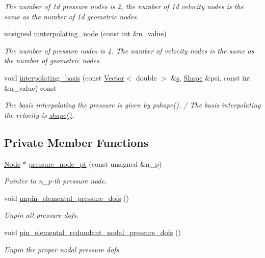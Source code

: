 \begin{DoxyCompactItemize}
\begin{DoxyCompactList}\small\item\em The number of 1d pressure nodes is 2, the number of 1d velocity nodes is the same as the number of 1d geometric nodes. \end{DoxyCompactList}\item 
unsigned \hyperlink{classoomph_1_1RefineableAxisymmetricQTaylorHoodElement_a637fff45cb50b55c9c05633321489b89}{ninterpolating\+\_\+node} (const int \&n\+\_\+value)
\begin{DoxyCompactList}\small\item\em The number of pressure nodes is 4. The number of velocity nodes is the same as the number of geometric nodes. \end{DoxyCompactList}\item 
void \hyperlink{classoomph_1_1RefineableAxisymmetricQTaylorHoodElement_a20d24729129ee059ab89b407c02d1cb8}{interpolating\+\_\+basis} (const \hyperlink{classoomph_1_1Vector}{Vector}$<$ double $>$ \&\hyperlink{cfortran_8h_ab7123126e4885ef647dd9c6e3807a21c}{s}, \hyperlink{classoomph_1_1Shape}{Shape} \&psi, const int \&n\+\_\+value) const
\begin{DoxyCompactList}\small\item\em The basis interpolating the pressure is given by pshape(). / The basis interpolating the velocity is \hyperlink{classoomph_1_1FiniteElement_a58a25b6859ddd43b7bfe64a19fee5023}{shape()}. \end{DoxyCompactList}\end{DoxyCompactItemize}
\subsection*{Private Member Functions}
\begin{DoxyCompactItemize}
\item 
\hyperlink{classoomph_1_1Node}{Node} $\ast$ \hyperlink{classoomph_1_1RefineableAxisymmetricQTaylorHoodElement_a1d0228372441c2332b9fed4fd1ad44ad}{pressure\+\_\+node\+\_\+pt} (const unsigned \&n\+\_\+p)
\begin{DoxyCompactList}\small\item\em Pointer to n\+\_\+p-\/th pressure node. \end{DoxyCompactList}\item 
void \hyperlink{classoomph_1_1RefineableAxisymmetricQTaylorHoodElement_a8f9a8ab37c89caf1460ee47dc667a4f0}{unpin\+\_\+elemental\+\_\+pressure\+\_\+dofs} ()
\begin{DoxyCompactList}\small\item\em Unpin all pressure dofs. \end{DoxyCompactList}\item 
void \hyperlink{classoomph_1_1RefineableAxisymmetricQTaylorHoodElement_a14e45b922f221125dcfccae8817e1534}{pin\+\_\+elemental\+\_\+redundant\+\_\+nodal\+\_\+pressure\+\_\+dofs} ()
\begin{DoxyCompactList}\small\item\em Unpin the proper nodal pressure dofs. \end{DoxyCompactList}\end{DoxyCompactItemize}
